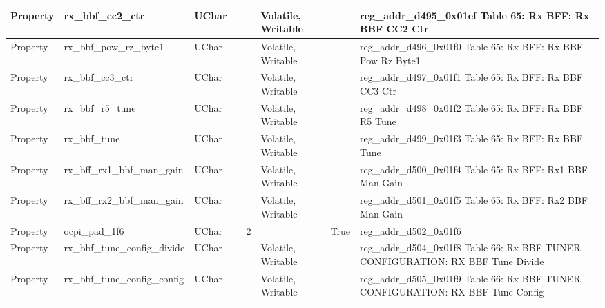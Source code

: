 \documentclass{article}
\begin{document}
\begin{scriptsize}
\begin{longtable}{|p{2cm}|p{5cm}|p{1cm}|p{2cm}|p{2cm}|p{1.75cm}|p{1.5cm}|p{5.1cm}|}
  \hline
  Property & rx\_bbf\_cc2\_ctr                                        & UChar &                  &                  & Volatile,  Writable &         & reg\_addr\_d495\_0x01ef Table 65: Rx BFF: Rx BBF CC2 Ctr \\
  \hline
  Property & rx\_bbf\_pow\_rz\_byte1                                  & UChar &                  &                  & Volatile,  Writable &         & reg\_addr\_d496\_0x01f0 Table 65: Rx BFF: Rx BBF Pow Rz Byte1 \\
  \hline
  Property & rx\_bbf\_cc3\_ctr                                        & UChar &                  &                  & Volatile,  Writable &         & reg\_addr\_d497\_0x01f1 Table 65: Rx BFF: Rx BBF CC3 Ctr \\
  \hline
  Property & rx\_bbf\_r5\_tune                                        & UChar &                  &                  & Volatile,  Writable &         & reg\_addr\_d498\_0x01f2 Table 65: Rx BFF: Rx BBF R5 Tune \\
  \hline
  Property & rx\_bbf\_tune                                            & UChar &                  &                  & Volatile,  Writable &         & reg\_addr\_d499\_0x01f3 Table 65: Rx BFF: Rx BBF Tune \\
  \hline
  Property & rx\_bff\_rx1\_bbf\_man\_gain                             & UChar &                  &                  & Volatile,  Writable &         & reg\_addr\_d500\_0x01f4 Table 65: Rx BFF: Rx1 BBF Man Gain \\
  \hline
  Property & rx\_bff\_rx2\_bbf\_man\_gain                             & UChar &                  &                  & Volatile,  Writable &         & reg\_addr\_d501\_0x01f5 Table 65: Rx BFF: Rx2 BBF Man Gain \\
  \hline
  Property & ocpi\_pad\_1f6                                           & UChar &                  & 2                &                     & True    & reg\_addr\_d502\_0x01f6 \\
  \hline
  Property & rx\_bbf\_tune\_config\_divide                            & UChar &                  &                  & Volatile,  Writable &         & reg\_addr\_d504\_0x01f8 Table 66: Rx BBF TUNER CONFIGURATION: RX BBF Tune Divide \\
  \hline
  Property & rx\_bbf\_tune\_config\_config                            & UChar &                  &                  & Volatile,  Writable &         & reg\_addr\_d505\_0x01f9 Table 66: Rx BBF TUNER CONFIGURATION: RX BBF Tune Config \\

\end{longtable}
\end{scriptsize}
\end{document}

